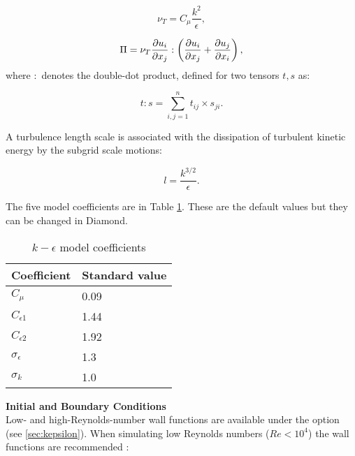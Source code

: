 \begin{equation}\label{nut}
\nu_T = C_\mu \frac{k^2}{\epsilon},
\end{equation}

\begin{equation}\label{Pi2}
\Pi = \nu_T \ppx[x_j]{u_i} : \left ( \ppx[x_j]{u_i} + \ppx[x_i]{u_j} \right ),
\end{equation}
where $:$ denotes the double-dot product, defined for two tensors $t, s$ as:

\begin{equation}\label{doubledot}
t:s = \sum_{i,j=1}^{n} t_{ij} \times s_{ji}.
\end{equation}

A turbulence length scale is associated with the dissipation of turbulent kinetic energy by the subgrid scale motions:

\begin{equation}\label{lengthscale}
l = \frac{k^{3/2}}{\epsilon}.
\end{equation}

The five model coefficients are in Table \ref{tab:kepsco}. These are the default values but they can be changed in Diamond.

\begin{table}[hb]
\begin{center}
\begin{tabular}{ll}\hline
Coefficient & Standard value \\ \hline
$C_\mu$ & 0.09 \\
$C_{\epsilon1}$ & 1.44 \\
$C_{\epsilon2}$ & 1.92 \\
$\sigma_\epsilon$ & 1.3 \\
$\sigma_k$ & 1.0 \\ \hline
\end{tabular}
\end{center}
\caption{$k-\epsilon$ model coefficients}
\label{tab:kepsco}
\end{table}

\par{\textbf{Initial and Boundary Conditions}\\}
Low- and high-Reynolds-number wall functions are available under the option \linebreak {} (see \ref{sec:kepsilon}). When simulating low Reynolds numbers ($Re<10^4$) the  wall functions are recommended \citep{wilcox1998turbulence}:

